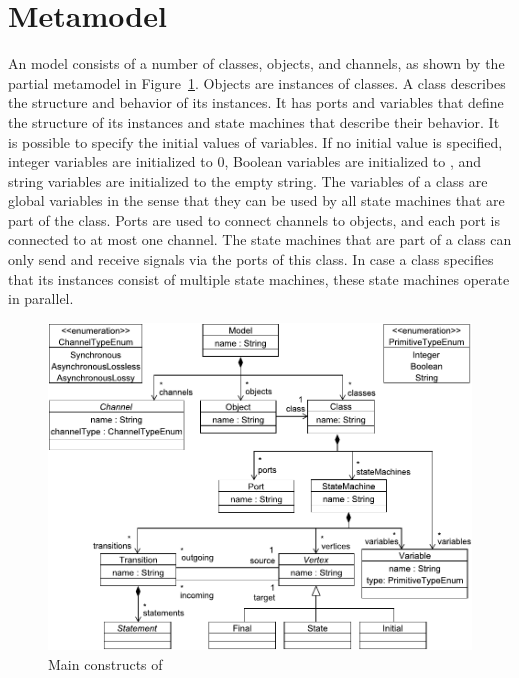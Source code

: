 \section{Metamodel}
\label{sec:slco:metamodel}

An \SLCO model consists of a number of classes, objects, and channels, as shown by the partial metamodel in Figure~\ref{fig:slco:MMMain}.
Objects are instances of classes.
A class describes the structure and behavior of its instances.
It has ports and variables that define the structure of its instances and state machines that describe their behavior.
It is possible to specify the initial values of variables.
If no initial value is specified, integer variables are initialized to $0$, Boolean variables are initialized to \SLCOTrue, and string variables are initialized to the empty string.
The variables of a class are global variables in the sense that they can be used by all state machines that are part of the class.
Ports are used to connect channels to objects, and each port is connected to at most one channel.
The state machines that are part of a class can only send and receive signals via the ports of this class.
In case a class specifies that its instances consist of multiple state machines, these state machines operate in parallel.

\begin{figure}[hbt]
 \centering
 \includegraphics[scale=0.6]{slco/figs/metamodel/mm_slco_main}
 \caption{Main constructs of \SLCO}
 \label{fig:slco:MMMain}
\end{figure}

